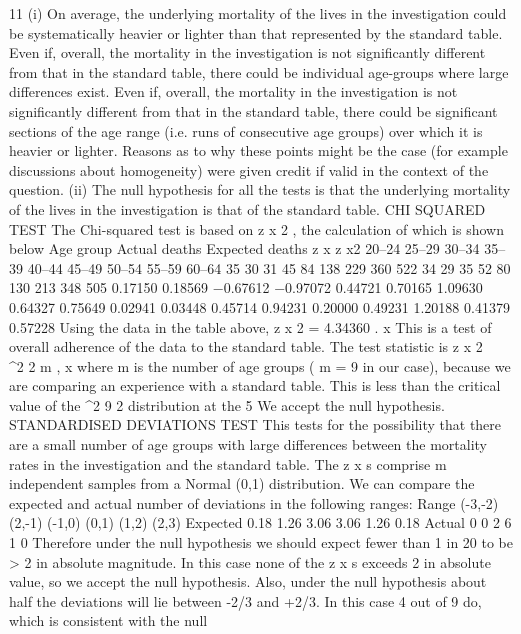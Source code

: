 \documentclass[a4paper,12pt]{article}
\begin{document}
11
(i)
On average, the underlying mortality of the lives in the investigation could be
systematically heavier or lighter than that represented by the standard table.
Even if, overall, the mortality in the investigation is not significantly different
from that in the standard table, there could be individual age-groups where
large differences exist.
Even if, overall, the mortality in the investigation is not significantly different
from that in the standard table, there could be significant sections of the age
range (i.e. runs of consecutive age groups) over which it is heavier or lighter.
Reasons as to why these points might be the case (for example discussions
about homogeneity) were given credit if valid in the context of the question.
(ii)
The null hypothesis for all the tests is that the underlying mortality of the lives
in the investigation is that of the standard table.
CHI SQUARED TEST
The Chi-squared test is based on z x 2 , the calculation of which is shown below
Age group Actual
deaths Expected
deaths z x z x2
20–24
25–29
30–34
35–39
40–44
45–49
50–54
55–59
60–64 35
30
31
45
84
138
229
360
522 34
29
35
52
80
130
213
348
505 0.17150
0.18569
−0.67612
−0.97072
0.44721
0.70165
1.09630
0.64327
0.75649 0.02941
0.03448
0.45714
0.94231
0.20000
0.49231
1.20188
0.41379
0.57228
Using the data in the table above,
\sum  z x 2 = 4.34360 .
x
This is a test of overall adherence of the data to the standard table.
The test statistic is
\sum  z x 2 ~ \chi^2 2 m ,
x
where m is the number of age groups ( m = 9 in our case), because we are
comparing an experience with a standard table.
This is less than the critical value of the \chi^2 9 2 distribution at the 5%
We accept the null hypothesis.
STANDARDISED DEVIATIONS TEST
This tests for the possibility that there are a small number of age groups with
large differences between the mortality rates in the investigation and the
standard table.
The z x s comprise m independent samples from a Normal (0,1) distribution.
We can compare the expected and actual number of deviations in the
following ranges:
Range
(-3,-2) (2,-1) (-1,0) (0,1) (1,2) (2,3)
Expected
0.18 1.26 3.06 3.06 1.26 0.18
Actual
0
0
2
6
1
0
Therefore under the null hypothesis we should expect fewer than 1 in 20 to be
> 2 in absolute magnitude. In this case none of the z x s exceeds 2 in absolute
value, so we accept the null hypothesis.
Also, under the null hypothesis about half the deviations will lie between -2/3
and +2/3. In this case 4 out of 9 do, which is consistent with the null
\end{document}
